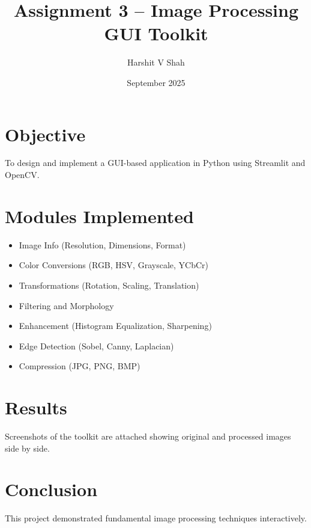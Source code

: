 \documentclass[12pt]{article}
\title{Assignment 3 -- Image Processing GUI Toolkit}
\author{Harshit V Shah}
\date{September 2025}
\begin{document}
\maketitle

\section*{Objective}
To design and implement a GUI-based application in Python using Streamlit and OpenCV.

\section*{Modules Implemented}
\begin{itemize}
\item Image Info (Resolution, Dimensions, Format)
\item Color Conversions (RGB, HSV, Grayscale, YCbCr)
\item Transformations (Rotation, Scaling, Translation)
\item Filtering and Morphology
\item Enhancement (Histogram Equalization, Sharpening)
\item Edge Detection (Sobel, Canny, Laplacian)
\item Compression (JPG, PNG, BMP)
\end{itemize}

\section*{Results}
Screenshots of the toolkit are attached showing original and processed images side by side.

\section*{Conclusion}
This project demonstrated fundamental image processing techniques interactively.
\end{document}
